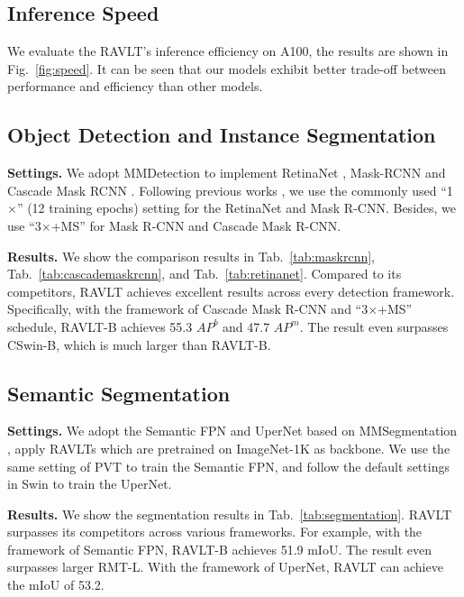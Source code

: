 \documentclass[10pt,twocolumn,letterpaper]{article}
\begin{document}
\subsection{Inference Speed}

We evaluate the RAVLT's inference efficiency on A100, the results are shown in Fig.~\ref{fig:speed}. It can be seen that our models exhibit better trade-off between performance and efficiency than other models.

\subsection{Object Detection and Instance Segmentation}

\textbf{Settings.} We adopt MMDetection \cite{chen2019mmdetection} to implement RetinaNet \cite{lin2017focal}, Mask-RCNN \cite{he2017mask} and Cascade Mask RCNN \cite{cai2018cascade}. Following previous works \cite{fan2023rmt,liu2021swin,wang2022pvtv2}, we use the commonly used ``1$\times$'' (12 training epochs) setting for the RetinaNet and Mask R-CNN. Besides, we use ``3$\times$+MS'' for Mask R-CNN and Cascade Mask R-CNN.

\textbf{Results.} We show the comparison results in Tab.~\ref{tab:maskrcnn}, Tab.~\ref{tab:cascademaskrcnn}, and Tab.~\ref{tab:retinanet}. Compared to its competitors, RAVLT achieves excellent results across every detection framework. Specifically, with the framework of Cascade Mask R-CNN and ``3$\times$+MS'' schedule, RAVLT-B achieves 55.3 $AP^b$ and 47.7 $AP^m$. The result even surpasses CSwin-B, which is much larger than RAVLT-B.

\subsection{Semantic Segmentation}

\textbf{Settings.} We adopt the Semantic FPN \cite{kirillov2019panoptic} and UperNet \cite{xiao2018unified} based on MMSegmentation \cite{mmseg2020}, apply RAVLTs which are pretrained on ImageNet-1K as backbone. We use the same setting of PVT \cite{wang2021pyramid} to train the Semantic FPN, and follow the default settings in Swin \cite{liu2021swin} to train the UperNet.

\textbf{Results.} We show the segmentation results in Tab.~\ref{tab:segmentation}. RAVLT surpasses its competitors across various frameworks. For example, with the framework of Semantic FPN, RAVLT-B achieves 51.9 mIoU. The result even surpasses larger RMT-L. With the framework of UperNet, RAVLT can achieve the mIoU of 53.2.
\end{document}
